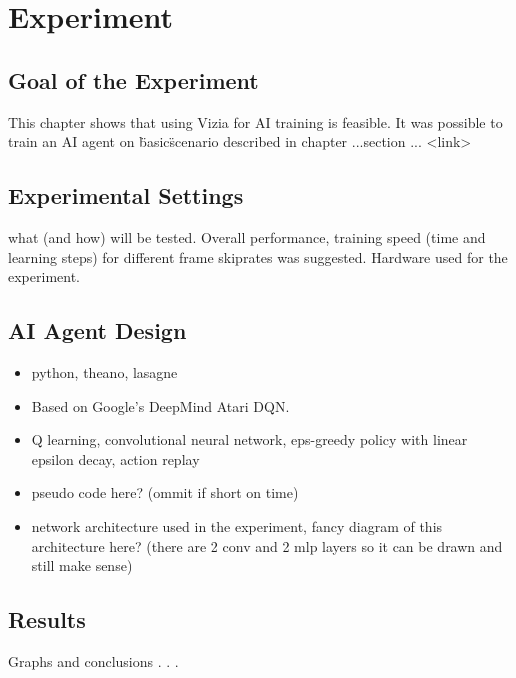 \chapter{Experiment}

\section{Goal of the Experiment}
This chapter shows that using Vizia for AI training is feasible. It was possible to train an AI agent on \"basic\" scenario described in chapter ...section ... <link> 

\section{Experimental Settings} 
what (and how) will be tested. Overall performance, training speed (time and learning steps) for different frame skiprates was suggested.
Hardware used for the experiment.

\section{AI Agent Design}
\begin{itemize}
\item python, theano, lasagne
\item Based on Google's DeepMind Atari DQN.
\item Q learning, convolutional neural network, eps-greedy policy with linear epsilon decay, action replay
\item pseudo code here? (ommit if short on time)
\item network architecture used in the experiment, fancy diagram of this architecture here? (there are 2 conv and 2 mlp layers so it can be drawn and still make sense)
\end{itemize}


\section{Results}
Graphs and conclusions . . .